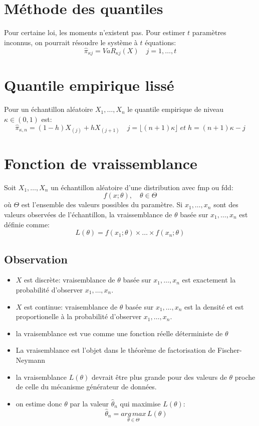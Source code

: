 \section{Méthode des quantiles}\label{methode-des-quantiles}

Pour certaine loi, les moments n'existent pas. Pour estimer \(t\)
paramètres inconnus, on pourrait résoudre le système à \(t\) équations:
\[
\hat{\pi}_{\kappa j}=VaR_{\kappa j}(X)\quad j=1,\dots,t
\]

\section{Quantile empirique lissé}\label{quantile-empirique-lisse}

Pour un échantillon aléatoire \(X_1,\dots,X_n\) le quantile empirique de
niveau \(\kappa\in(0,1)\) est: \[
\hat{\pi}_{\kappa,n}=(1-h)X_{(j)}+hX_{(j+1)}\quad j=\lfloor(n+1)\kappa\rfloor\;et \; h=(n+1)\kappa-j 
\]

\section{Fonction de vraissemblance}\label{fonction-de-vraissemblance}

Soit \(X_1,\dots,X_n\) un échantillon aléatoire d'une distribution avec
fmp ou fdd: \[
f(x;\theta),\quad \theta \in \Theta
\] où \(\Theta\) est l'ensemble des valeurs possibles du paramètre. Si
\(x_1,\dots,x_n\) sont des valeurs observées de l'échantillon, la
vraissemblance de \(\theta\) basée sur \(x_1,\dots,x_n\) est définie
comme: \[
L(\theta)=f(x_1;\theta)\times\dots\times f(x_n;\theta)
\]

\subsection*{Observation}\label{observation}

\begin{itemize}
\item
  \(X\) est discrète: vraisemblance de \(\theta\) basée sur
  \(x_1,\dots,x_n\) est exactement la probabilité d'observer
  \(x_1,\dots,x_n\).
\item
  \(X\) est continue: vraisemblance de \(\theta\) basée sur
  \(x_1,\dots,x_n\) est la densité et est proportionelle à la
  probabilité d'observer \(x_1,\dots,x_n\).
\item
  la vraisemblance est vue comme une fonction réelle déterministe de
  \(\theta\)
\item
  La vraisemblance est l'objet dans le théorème de factorisation de
  Fischer-Neymann
\item
  la vraisemblance \(L(\theta)\) devrait être plus grande pour des
  valeurs de \(\theta\) proche de celle du mécanisme générateur de
  données.
\item
  on estime donc \(\theta\) par la valeur \(\hat{\theta}_n\) qui
  maximise \(L(\theta)\): \[
  \hat{\theta}_n=\underset{\theta\in\Theta}{arg\,max}\,L(\theta) 
  \]
\end{itemize}

